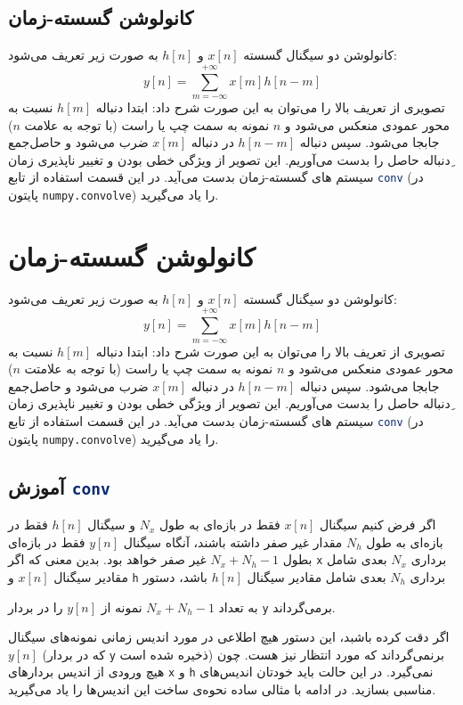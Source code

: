 \documentclass{utsignal}
\begin{document}
	\subsection{کانولوشن گسسته-زمان}
	کانولوشن دو سیگنال گسسته $x[n]$ و $h[n]$ به صورت زیر تعریف می‌شود:
	$$y[n]=\sum_{m=-\infty}^{+\infty} x[m]h[n-m]$$
	تصویری از تعریف بالا را می‌توان به این صورت شرح داد: ابتدا دنباله  $h[m]$ نسبت به محور عمودی منعکس می‌شود و  $n$ نمونه به سمت چپ یا راست (با توجه به علامت $n$) جابجا می‌شود. سپس دنباله  $h[n-m]$ در دنباله  $x[m]$ ضرب می‌شود و حاصل‌جمع ِدنباله حاصل را بدست می‌آوریم. این تصویر از ویژگی خطی بودن و تغییر ناپذیری زمان سیستم های گسسته-زمان بدست می‌آید. در این قسمت استفاده از تابع \lstinline[language=Octave]{conv} (در پایتون \lstinline[language=Python]{numpy.convolve}) را یاد می‌گیرید.

	\section{کانولوشن گسسته-زمان}
	کانولوشن دو سیگنال گسسته $x[n]$ و $h[n]$ به صورت زیر تعریف می‌شود:
	$$y[n]=\sum_{m=-\infty}^{+\infty} x[m]h[n-m]$$
	تصویری از تعریف بالا را می‌توان به این صورت شرح داد: ابتدا دنباله  $h[m]$ نسبت به محور عمودی منعکس می‌شود و  $n$ نمونه به سمت چپ یا راست (با توجه به علامتت $n$) جابجا می‌شود. سپس دنباله  $h[n-m]$ در دنباله  $x[m]$ ضرب می‌شود و حاصل‌جمع ِدنباله حاصل را بدست می‌آوریم. این تصویر از ویژگی خطی بودن و تغییر ناپذیری زمان سیستم های گسسته-زمان بدست می‌آید. در این قسمت استفاده از تابع \lstinline[language=Octave]{conv} (در پایتون \lstinline[language=Python]{numpy.convolve}) را یاد می‌گیرید.

	\subsection{آموزش \lstinline[language=Octave]{conv}}
	اگر فرض کنیم سیگنال $x[n]$ فقط در بازه‌ای به طول $N_x$ و سیگنال $h[n]$ فقط در بازه‌ای به طول $N_h$ مقدار غیر صفر داشته باشند، آنگاه سیگنال $y[n]$ فقط در بازه‌ای بطول $N_x+N_h-1$ غیر صفر خواهد بود. بدین معنی که اگر  \lstinline[language=Octave]{x} برداری $N_x$ بعدی شامل مقادیر سیگنال  $x[n]$ و \lstinline[language=Octave]{h} برداری $N_h$ بعدی شامل مقادیر سیگنال $h[n]$ باشد، دستور 
	\begin{latin}
		
	\end{latin}
	\noindent به تعداد $N_x+N_h-1$ نمونه از $y[n]$ را در بردار \lstinline[language=Octave]{y} برمی‌گرداند.
	
	اگر دقت کرده باشبد، این دستور هیچ اطلاعی در مورد اندیس زمانی نمونه‌های سیگنال $y[n]$ (که در بردار \lstinline[language=Octave]{y} ذخیره شده است) برنمی‌گرداند که مورد انتظار نیز هست. چون هیچ ورودی از اندیس بردارهای \lstinline[language=Octave]{x} و \lstinline[language=Octave]{h} نمی‌گیرد. در این حالت باید خودتان اندیس‌‌های مناسبی بسازید. در ادامه با مثالی ساده نحوه‌ی ساخت این اندیس‌ها را یاد می‌گیرید.
	
\end{document}
